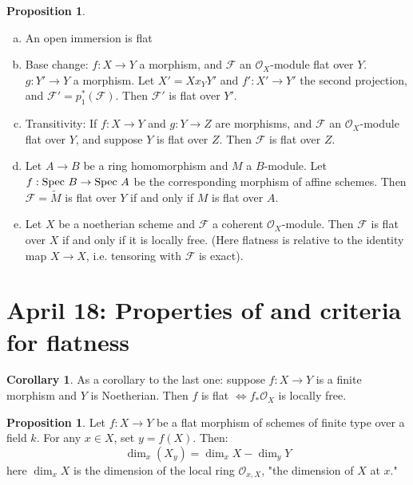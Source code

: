 \documentclass[10pt,reqno]{amsart}
\theoremstyle{definition}
\newtheorem{corollary}[theorem]{Corollary}
\newtheorem{proposition}[theorem]{Proposition}
\theoremstyle{remark}
\numberwithin{equation}{section}
\numberwithin{theorem}{section}
\newcommand{\OO}{{\mathcal O}}
\newcommand{\spec}{\textup{Spec }}
\newcommand{\FF}{{\mathscr F}}
\newcommand{\wt}{\widetilde}
\begin{document}
\begin{proposition}\textup{ }
\begin{enumerate}[(a)]
\item An open immersion is flat
\item Base change: $f: X \to Y$ a morphism, and $\FF$ an $\OO_X$-module flat over $Y$. $g: Y' \to Y$ a morphism. Let $X' = X x_Y Y'$ and $f': X' \to Y'$ the second projection, and $\FF' = p_1^*(\FF)$. Then $\FF'$ is flat over $Y'$.
\item Transitivity: If $f:X \to Y$ and $g: Y \to Z$ are morphisms, and $\FF$ an $\OO_X$-module flat over $Y$, and suppose $Y$ is flat over $Z$. Then $\FF$ is flat over $Z$.
\item Let $A \to B$ be a ring homomorphism and $M$ a $B$-module. Let $f: \spec B \to \spec A$ be the corresponding morphism of affine schemes. Then $\FF = \wt{M}$ is flat over $Y$ if and only if $M$ is flat over $A$. 
\item Let $X$ be a noetherian scheme and $\FF$ a coherent $\OO_X$-module. Then $\FF$ is flat over $X$ if and only if it is locally free. (Here flatness is relative to the identity map $X \to X$, i.e. tensoring with $\FF$ is exact).
\end{enumerate}
\end{proposition}
\section{April 18: Properties of and criteria for flatness}

\begin{corollary}
As a corollary to the last one: suppose $f:X \to Y$ is a finite morphism and $Y$ is Noetherian. Then $f$ is flat $\iff f_* \OO_X$ is locally free.
\end{corollary}
\begin{proposition} Let $f: X \to Y$ be a flat morphism of schemes of finite type over a field $k$. For any $x \in X$, set $y = f(X)$. Then:
\[\dim_x(X_y) = \dim_x X - \dim_y Y\]
here $\dim_x X$ is the dimension of the local ring $\OO_{x,X}$, "the dimension of $X$ at $x$."
\end{proposition}
\end{document}
